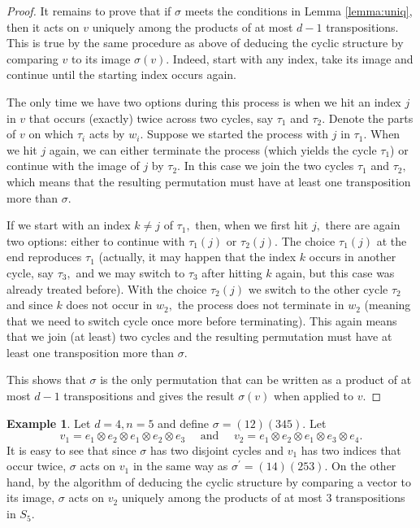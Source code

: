 \documentclass[12pt,dvipsnames,accepted=2016-08-18,a4paper,onecolumn]{quantumarticle}
\numberwithin{equation}{section}
\theoremstyle{definition}
\newtheorem{example}[theorem]{Example}
\begin{document}
\begin{proof}
	
	It remains to prove that if $\sigma$ meets the conditions in Lemma \ref{lemma:uniq}, then it acts on $v$ uniquely among the products of at most $d-1$ transpositions. This is true by the same procedure as above of deducing the cyclic structure by comparing $v$ to its image $\sigma(v).$ Indeed, start with any index, take its image and continue until the starting index occurs again.
	
	The only time we have two options during this process is when we hit an index $j$ in $v$ that occurs (exactly) twice across two cycles, say $\tau_1$ and $\tau_2.$ Denote the parts of $v$ on which $\tau_i$ acts by $w_i.$ Suppose we started the process with $j$ in $\tau_1.$ When we hit $j$ again, we can either terminate the process (which yields the cycle $\tau_1$) or continue with the image of $j$ by $\tau_2.$ In this case we join the two cycles $\tau_1$ and $\tau_2,$ which means that the resulting permutation must have at least one  transposition more than $\sigma.$ 
	
	If we start with an index $k \neq j$ of $\tau_1,$ then, when we first hit $j,$ there are again two options: either to continue with $\tau_1(j)$ or $\tau_2(j).$ The choice $\tau_1(j)$ at the end reproduces $\tau_1$ (actually, it may happen that the index $k$ occurs in another cycle, say $\tau_3,$ and we may switch to $\tau_3$ after hitting $k$ again, but this case was already treated before). With the choice $\tau_2(j)$ we switch to the other cycle $\tau_2$ and since $k$ does not occur in $w_2,$ the process does not terminate in $w_2$ (meaning that we need to switch cycle once more before terminating). This again means that we join (at least) two cycles and the resulting permutation must have at least one  transposition more than $\sigma.$

	This shows that $\sigma$ is the only permutation that can be written as a product of at most $d-1$ transpositions and gives the result $\sigma(v)$ when applied to $v.$
\end{proof}
	
	
\begin{example}
	Let $d=4,n=5$ and define $\sigma = (12)(345).$ Let
	$$
	v_1 = e_1 \otimes e_2 \otimes e_1 \otimes e_2 \otimes e_3 \quad \text{ and }\quad 
	v_2 = e_1 \otimes e_2 \otimes e_1 \otimes e_3 \otimes e_4.
	$$
	It is easy to see that since $\sigma$ has two disjoint cycles and $v_1$ has two indices that occur twice, $\sigma$ acts on $v_1$ in the same way as $\sigma^\prime = (14)(253).$ On the other hand, by the algorithm of deducing the cyclic structure by comparing a vector to its image, $\sigma$ acts on $v_2$ uniquely among the products of at most $3$ transpositions in $S_5.$
\end{example}
	
\end{document}
